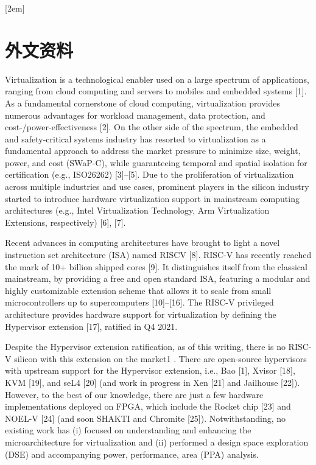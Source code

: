 
[2em]{\vspace{.5\baselineskip}\xiaosan\song}%
             {\prechaptername\CJKnumber{\thecontentslabel}\postchaptername\qquad}{} %
             {}             %
\chapter*{外文资料}
Virtualization is a technological enabler used on a large
spectrum of applications, ranging from cloud computing and
servers to mobiles and embedded systems [1]. As a fundamental cornerstone of cloud computing, virtualization provides
numerous advantages for workload management, data protection, and cost-/power-effectiveness [2]. On the other side of the
spectrum, the embedded and safety-critical systems industry
has resorted to virtualization as a fundamental approach to
address the market pressure to minimize size, weight, power,
and cost (SWaP-C), while guaranteeing temporal and spatial
isolation for certification (e.g., ISO26262) [3]–[5]. Due to the
proliferation of virtualization across multiple industries and
use cases, prominent players in the silicon industry started
to introduce hardware virtualization support in mainstream
computing architectures (e.g., Intel Virtualization Technology,
Arm Virtualization Extensions, respectively) [6], [7].


Recent advances in computing architectures have brought to
light a novel instruction set architecture (ISA) named RISCV [8]. RISC-V has recently reached the mark of 10+ billion
shipped cores [9]. It distinguishes itself from the classical
mainstream, by providing a free and open standard ISA,
featuring a modular and highly customizable extension scheme
that allows it to scale from small microcontrollers up to
supercomputers [10]–[16]. The RISC-V privileged architecture
provides hardware support for virtualization by defining the
Hypervisor extension [17], ratified in Q4 2021.


Despite the Hypervisor extension ratification, as of this
writing, there is no RISC-V silicon with this extension on
the market1
. There are open-source hypervisors with upstream
support for the Hypervisor extension, i.e., Bao [1], Xvisor [18],
KVM [19], and seL4 [20] (and work in progress in Xen [21]
and Jailhouse [22]). However, to the best of our knowledge,
there are just a few hardware implementations deployed on
FPGA, which include the Rocket chip [23] and NOEL-V [24]
(and soon SHAKTI and Chromite [25]). Notwithstanding, no
existing work has (i) focused on understanding and enhancing
the microarchitecture for virtualization and (ii) performed a
design space exploration (DSE) and accompanying power,
performance, area (PPA) analysis.


